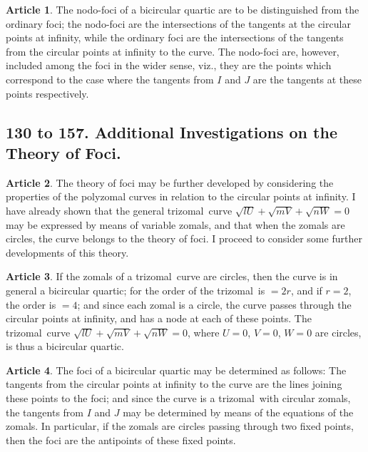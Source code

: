 \documentclass[11pt,a4paper]{article}
\theoremstyle{definition}
\newtheorem{art}{Article}
\newcommand{\trizomal}{trizomal}
\begin{document}
\begin{art}
The nodo-foci of a bicircular quartic are to be distinguished from the ordinary foci; the nodo-foci are the intersections of the tangents at the circular points at infinity, while the ordinary foci are the intersections of the tangents from the circular points at infinity to the curve. The nodo-foci are, however, included among the foci in the wider sense, viz., they are the points which correspond to the case where the tangents from $I$ and $J$ are the tangents at these points respectively.
\end{art}

\subsection*{130 to 157. Additional Investigations on the Theory of Foci.}

\begin{art}
The theory of foci may be further developed by considering the properties of the polyzomal curves in relation to the circular points at infinity. I have already shown that the general \trizomal\ curve $\sqrt{lU} + \sqrt{mV} + \sqrt{nW} = 0$ may be expressed by means of variable zomals, and that when the zomals are circles, the curve belongs to the theory of foci. I proceed to consider some further developments of this theory.
\end{art}

\begin{art}
If the zomals of a \trizomal\ curve are circles, then the curve is in general a bicircular quartic; for the order of the \trizomal\ is $= 2r$, and if $r = 2$, the order is $= 4$; and since each zomal is a circle, the curve passes through the circular points at infinity, and has a node at each of these points. The \trizomal\ curve $\sqrt{lU} + \sqrt{mV} + \sqrt{nW} = 0$, where $U = 0$, $V = 0$, $W = 0$ are circles, is thus a bicircular quartic.
\end{art}

\begin{art}
The foci of a bicircular quartic may be determined as follows: The tangents from the circular points at infinity to the curve are the lines joining these points to the foci; and since the curve is a \trizomal\ with circular zomals, the tangents from $I$ and $J$ may be determined by means of the equations of the zomals. In particular, if the zomals are circles passing through two fixed points, then the foci are the antipoints of these fixed points.
\end{art}
\end{document}
